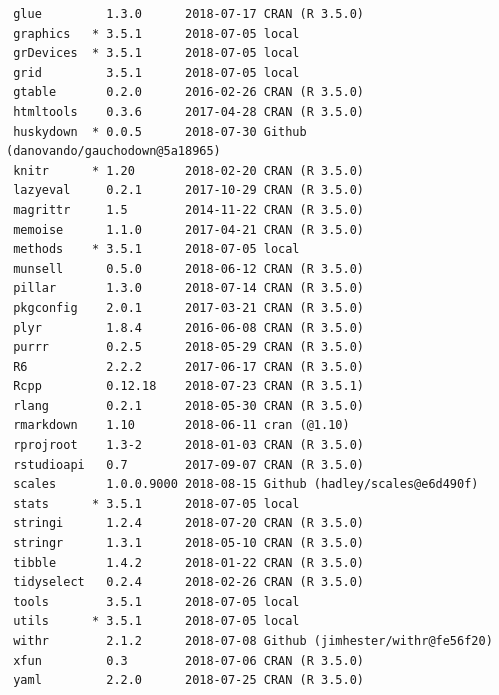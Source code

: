 \documentclass[twoside,12pt,final]{ucthesis-CA2012}
\begin{document}
\begin{ucmainmatter}
\begin{verbatim}
 glue         1.3.0      2018-07-17 CRAN (R 3.5.0)                       
 graphics   * 3.5.1      2018-07-05 local                                
 grDevices  * 3.5.1      2018-07-05 local                                
 grid         3.5.1      2018-07-05 local                                
 gtable       0.2.0      2016-02-26 CRAN (R 3.5.0)                       
 htmltools    0.3.6      2017-04-28 CRAN (R 3.5.0)                       
 huskydown  * 0.0.5      2018-07-30 Github (danovando/gauchodown@5a18965)
 knitr      * 1.20       2018-02-20 CRAN (R 3.5.0)                       
 lazyeval     0.2.1      2017-10-29 CRAN (R 3.5.0)                       
 magrittr     1.5        2014-11-22 CRAN (R 3.5.0)                       
 memoise      1.1.0      2017-04-21 CRAN (R 3.5.0)                       
 methods    * 3.5.1      2018-07-05 local                                
 munsell      0.5.0      2018-06-12 CRAN (R 3.5.0)                       
 pillar       1.3.0      2018-07-14 CRAN (R 3.5.0)                       
 pkgconfig    2.0.1      2017-03-21 CRAN (R 3.5.0)                       
 plyr         1.8.4      2016-06-08 CRAN (R 3.5.0)                       
 purrr        0.2.5      2018-05-29 CRAN (R 3.5.0)                       
 R6           2.2.2      2017-06-17 CRAN (R 3.5.0)                       
 Rcpp         0.12.18    2018-07-23 CRAN (R 3.5.1)                       
 rlang        0.2.1      2018-05-30 CRAN (R 3.5.0)                       
 rmarkdown    1.10       2018-06-11 cran (@1.10)                         
 rprojroot    1.3-2      2018-01-03 CRAN (R 3.5.0)                       
 rstudioapi   0.7        2017-09-07 CRAN (R 3.5.0)                       
 scales       1.0.0.9000 2018-08-15 Github (hadley/scales@e6d490f)       
 stats      * 3.5.1      2018-07-05 local                                
 stringi      1.2.4      2018-07-20 CRAN (R 3.5.0)                       
 stringr      1.3.1      2018-05-10 CRAN (R 3.5.0)                       
 tibble       1.4.2      2018-01-22 CRAN (R 3.5.0)                       
 tidyselect   0.2.4      2018-02-26 CRAN (R 3.5.0)                       
 tools        3.5.1      2018-07-05 local                                
 utils      * 3.5.1      2018-07-05 local                                
 withr        2.1.2      2018-07-08 Github (jimhester/withr@fe56f20)     
 xfun         0.3        2018-07-06 CRAN (R 3.5.0)                       
 yaml         2.2.0      2018-07-25 CRAN (R 3.5.0)                       
\end{verbatim}
\backmatter


\end{ucmainmatter}
\end{document}
